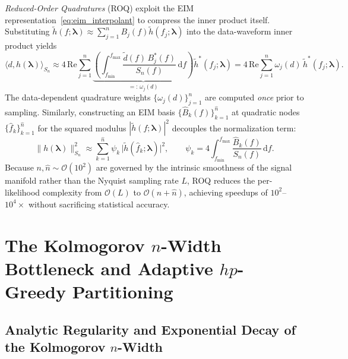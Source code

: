 \documentclass[11pt, a4paper]{article}
\begin{document}
\emph{Reduced-Order Quadratures} (ROQ) \cite{Antil2013,Canizares2013,Canizares2015,Smith2016} exploit the EIM representation~\eqref{eq:eim_interpolant} to compress the inner product itself. Substituting $\tilde{h}(f; \boldsymbol{\lambda}) \approx \sum_{j=1}^n B_j(f) \tilde{h}(f_j; \boldsymbol{\lambda})$ into the data-waveform inner product yields
\begin{equation}
\langle d, h(\boldsymbol{\lambda}) \rangle_{S_n} \approx 4\,\mathrm{Re} \sum_{j=1}^n \underbrace{\left( \int_{f_{\min}}^{f_{\max}} \frac{\tilde{d}(f)\,B_j^*(f)}{S_n(f)}\,\mathrm{d}f \right)}_{=:\,\omega_j(d)} \tilde{h}^*(f_j; \boldsymbol{\lambda}) = 4\,\mathrm{Re} \sum_{j=1}^n \omega_j(d)\,\tilde{h}^*(f_j; \boldsymbol{\lambda}) .
\label{eq:roq_linear}
\end{equation}
The data-dependent quadrature weights $\{\omega_j(d)\}_{j=1}^n$ are computed \emph{once} prior to sampling. Similarly, constructing an EIM basis $\{\hat{B}_k(f)\}_{k=1}^{\hat{n}}$ at quadratic nodes $\{\hat{f}_k\}_{k=1}^{\hat{n}}$ for the squared modulus $|\tilde{h}(f; \boldsymbol{\lambda})|^2$ decouples the normalization term:
\begin{equation}
\|h(\boldsymbol{\lambda})\|_{S_n}^2 \approx \sum_{k=1}^{\hat{n}} \psi_k\,\bigl|\tilde{h}(\hat{f}_k; \boldsymbol{\lambda})\bigr|^2 , \qquad
\psi_k = 4 \int_{f_{\min}}^{f_{\max}} \frac{\hat{B}_k(f)}{S_n(f)}\,\mathrm{d}f .
\label{eq:roq_quadratic}
\end{equation}
Because $n, \hat{n} \sim \mathcal{O}(10^2)$ are governed by the intrinsic smoothness of the signal manifold rather than the Nyquist sampling rate $L$, ROQ reduces the per-likelihood complexity from $\mathcal{O}(L)$ to $\mathcal{O}(n + \hat{n})$, achieving speedups of $10^2$--$10^4\times$ without sacrificing statistical accuracy.

\section{The Kolmogorov $n$-Width Bottleneck and Adaptive $hp$-Greedy Partitioning}
\label{sec:nwidth_hpgreedy}

\subsection{Analytic Regularity and Exponential Decay of the Kolmogorov $n$-Width}
\end{document}
